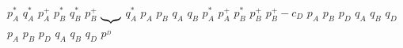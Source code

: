 \documentclass[10pt]{article}
\begin{document}
$p^*_A$%
\stopmpxshipout
\mpxshipout%
$q^*_A$%
\stopmpxshipout
\mpxshipout%
$p^+_A$%
\stopmpxshipout
\mpxshipout%
$p^*_B$%
\stopmpxshipout
\mpxshipout%
$q^*_B$%
\stopmpxshipout
\mpxshipout%
$p^+_B$%
\stopmpxshipout
\mpxshipout%
$\underbrace{\hskip2mm}$%
\stopmpxshipout
\mpxshipout%
$q^*_A$%
\stopmpxshipout
\mpxshipout%
$p_A$%
\stopmpxshipout
\mpxshipout%
$p_B$%
\stopmpxshipout
\mpxshipout%
$q_A$%
\stopmpxshipout
\mpxshipout%
$q_B$%
\stopmpxshipout
\mpxshipout%
$p^*_A$%
\stopmpxshipout
\mpxshipout%
$p^+_A$%
\stopmpxshipout
\mpxshipout%
$p^*_B$%
\stopmpxshipout
\mpxshipout%
$p^+_B$%
\stopmpxshipout
\mpxshipout%
$p^+_B-c_D$%
\stopmpxshipout
\mpxshipout%
$p_A$%
\stopmpxshipout
\mpxshipout%
$p_B$%
\stopmpxshipout
\mpxshipout%
$p_D$%
\stopmpxshipout
\mpxshipout%
$q_A$%
\stopmpxshipout
\mpxshipout%
$q_B$%
\stopmpxshipout
\mpxshipout%
$q_D$%
\stopmpxshipout
\mpxshipout%
$p_A$%
\stopmpxshipout
\mpxshipout%
$p_B$%
\stopmpxshipout
\mpxshipout%
$p_D$%
\stopmpxshipout
\mpxshipout%
$q_A$%
\stopmpxshipout
\mpxshipout%
$q_B$%
\stopmpxshipout
\mpxshipout%
$q_D$%
\stopmpxshipout
\mpxshipout%
$p^_D$%
\stopmpxshipout
\end{document}
